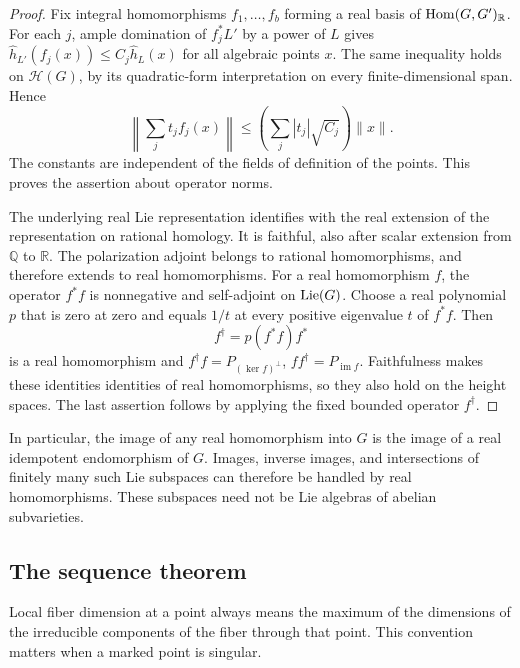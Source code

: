 \begin{proof}
Fix integral homomorphisms $f_1,\ldots,f_b$ forming a real basis of
$\operatorname{Hom}(G,G')_{\mathbb R}$. For each $j$, ample domination of $f_j^*L'$
by a power of $L$ gives
$\widehat h_{L'}(f_j(x))\le C_j\widehat h_L(x)$ for all algebraic
points $x$. The same inequality holds on $\mathcal H(G)$, by its
quadratic-form interpretation on every finite-dimensional span. Hence
\[
 \left\|\sum_j t_j f_j(x)\right\|
 \le \left(\sum_j |t_j|\sqrt{C_j}\right)\|x\|.
\]
The constants are independent of the fields of definition of the
points. This proves the assertion about operator norms.

The underlying real Lie representation identifies with the real
extension of the representation on rational homology. It is faithful,
also after scalar extension from $\mathbb Q$ to $\mathbb R$. The
polarization adjoint belongs to rational homomorphisms, and therefore
extends to real homomorphisms. For a real homomorphism $f$, the operator
$f^*f$ is nonnegative and self-adjoint on $\operatorname{Lie}(G)$. Choose a real
polynomial $p$ that is zero at zero and equals $1/t$ at every positive
eigenvalue $t$ of $f^*f$. Then
\[
 f^\dagger=p(f^*f)f^*
\]
is a real homomorphism and
$f^\dagger f=P_{(\ker f)^\perp}$,
$ff^\dagger=P_{\operatorname{im}f}$.
Faithfulness makes these identities identities of real homomorphisms,
so they also hold on the height spaces. The last assertion follows by
applying the fixed bounded operator $f^\dagger$.
\end{proof}

In particular, the image of any real homomorphism into $G$ is the image
of a real idempotent endomorphism of $G$. Images, inverse images, and
intersections of finitely many such Lie subspaces can therefore be
handled by real homomorphisms. These subspaces need not be Lie algebras
of abelian subvarieties.

\subsection{The sequence theorem}

Local fiber dimension at a point always means the maximum of the
dimensions of the irreducible components of the fiber through that
point. This convention matters when a marked point is singular.

